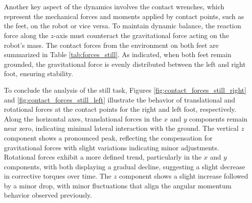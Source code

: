 \documentclass[main.tex]{subfiles}
\begin{document}
\begin{sloppypar}
\begin{figure}[htbp]
    \label{fig:comparison_still}
\end{figure}
\\
\\
Another key aspect of the dynamics involves the contact wrenches, which represent the mechanical forces and moments applied by contact points, such as the feet, on the robot or vice versa. To maintain dynamic balance, the reaction force along the $z$-axis must counteract the gravitational force acting on the robot’s mass. The contact forces from the environment on both feet are summarized in Table \ref{tab:forces_still}. As indicated, when both feet remain grounded, the gravitational force is evenly distributed between the left and right foot, ensuring stability. \\
\begin{table}[H]
    \centering
    \renewcommand{\arraystretch}{1.2}
    \caption{Summary of Forces and Foot Positions per Interval - Still Task}
    \label{tab:forces_still}
\end{table}
\newpage
To conclude the analysis of the still task, Figures \ref{fig:contact_forces_still_right} and \ref{fig:contact_forces_still_left} illustrate the behavior of translational and rotational forces at the contact points for the right and left foot, respectively. Along the horizontal axes, translational forces in the \( x \) and \( y \) components remain near zero, indicating minimal lateral interaction with the ground. The vertical \( z \) component shows a pronounced peak, reflecting the compensation for gravitational forces with slight variations indicating minor adjustments. Rotational forces exhibit a more defined trend, particularly in the \( x \) and \( y \) components, with both displaying a gradual decline, suggesting a slight decrease in corrective torques over time. The \( z \) component shows a slight increase followed by a minor drop, with minor fluctuations that align the angular momentum behavior observed previously. 

\end{sloppypar}
\end{document}
